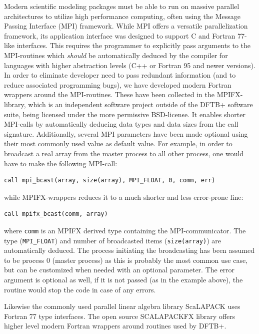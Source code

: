 \documentclass[reprint,onecolumn,superscriptaddress]{revtex4-1}
\newcommand{\dftbp}{DFTB+}
\begin{document}
Modern scientific modeling packages must be able to run on massive parallel
architectures to utilize high performance computing, often using the Message
Passing Interface (MPI) framework. While MPI offers a versatile parallelization
framework, its application interface was designed to support C and Fortran
77-like interfaces. This requires the programmer to explicitly pass arguments to the
MPI-routines which {\em should} be automatically deduced by the compiler for
languages with higher abstraction levels (C++ or Fortran 95 and newer versions).
In order to eliminate developer need to pass redundant information (and to
reduce associated programming bugs), we have developed modern Fortran wrappers
around the MPI-routines. These have been collected in the
MPIFX-library,\cite{mpifx} which is an independent software project outside of the
\dftbp{} software suite, being licensed under the more permissive
BSD-license. It enables shorter MPI-calls by automatically deducing data types
and data sizes from the call signature. Additionally, several MPI parameters
have been made optional using their most commonly used value as default
value. For example, in order to broadcast a real array from the master process
to all other process, one would have to make the following MPI-call:
\begin{verbatim}
call mpi_bcast(array, size(array), MPI_FLOAT, 0, comm, err)
\end{verbatim}
while MPIFX-wrappers reduces it to a much shorter and less error-prone line:
\begin{verbatim}
call mpifx_bcast(comm, array)
\end{verbatim}
where \verb|comm| is an MPIFX derived type containing the MPI-communicator. The
type (\verb|MPI_FLOAT|) and number of broadcasted items (\verb|size(array)|) are
automatically deduced. The process initiating the broadcasting has been assumed
to be process 0 (master process) as this is probably the most common use case,
but can be customized when needed with an optional parameter. The error
argument is optional as well, if it is not passed (as in the example above),
the routine would stop the code in case of any errors.

Likewise the commonly used parallel linear algebra library ScaLAPACK uses
Fortran 77 type interfaces. The open source SCALAPACKFX
library\cite{scalapackfx} offers higher level modern Fortran wrappers around
routines used by \dftbp{}.
\end{document}
